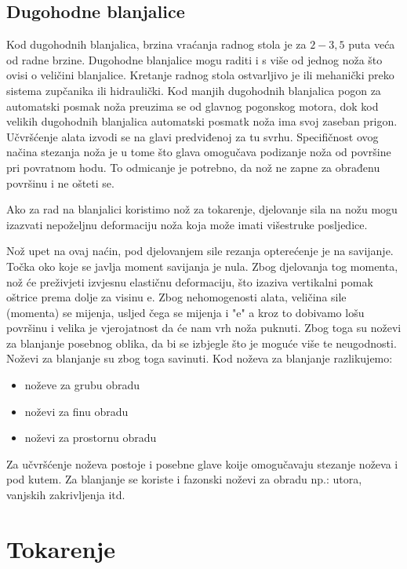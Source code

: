 \documentclass[a4paper,12pt]{article}
\numberwithin{figure}{section}
\begin{document}
\subsection{Dugohodne blanjalice}
Kod dugohodnih blanjalica, brzina vraćanja radnog stola je  za $2 -3,5$ puta veća od radne brzine. Dugohodne blanjalice mogu raditi i s više od jednog noža što ovisi o veličini blanjalice. Kretanje radnog stola ostvarljivo je ili mehanički preko sistema zupčanika ili hidraulički. Kod manjih dugohodnih blanjalica pogon za automatski posmak noža preuzima se od glavnog pogonskog motora, dok kod velikih dugohodnih blanjalica automatski posmatk noža ima svoj zaseban prigon. Učvršćenje alata izvodi se na glavi predviđenoj za tu svrhu.
Specifičnost ovog načina stezanja noža je u tome što glava omogučava podizanje noža od površine pri povratnom hodu. To odmicanje je potrebno, da nož ne zapne za obrađenu površinu i ne ošteti se.\par 
Ako za rad na blanjalici koristimo nož za tokarenje, djelovanje sila na nožu mogu izazvati nepoželjnu deformaciju noža koja može imati višestruke posljedice. \par
Nož upet na ovaj naćin, pod djelovanjem sile rezanja opterećenje je na savijanje. Točka oko koje se javlja moment savijanja je nula. Zbog djelovanja tog momenta, nož će preživjeti izvjesnu elastičnu deformaciju, što izaziva vertikalni pomak oštrice prema dolje za visinu e. Zbog nehomogenosti alata, veličina sile (momenta) se mijenja, usljed čega se mijenja i "e" a kroz to dobivamo lošu površinu i velika je vjerojatnost da će nam vrh noža puknuti. Zbog toga su noževi za blanjanje posebnog oblika, da bi se izbjegle što je moguće više te neugodnosti. Noževi za blanjanje su zbog toga savinuti.
Kod noževa za blanjanje razlikujemo:
\begin{itemize}
\item noževe za grubu obradu
\item noževi za finu obradu
\item noževi za prostornu obradu
\end{itemize}
Za učvršćenje noževa postoje i posebne glave koije omogučavaju stezanje noževa i pod kutem. Za blanjanje se koriste i fazonski noževi za obradu np.: utora, vanjskih zakrivljenja itd.
\section{Tokarenje}
\end{document}
